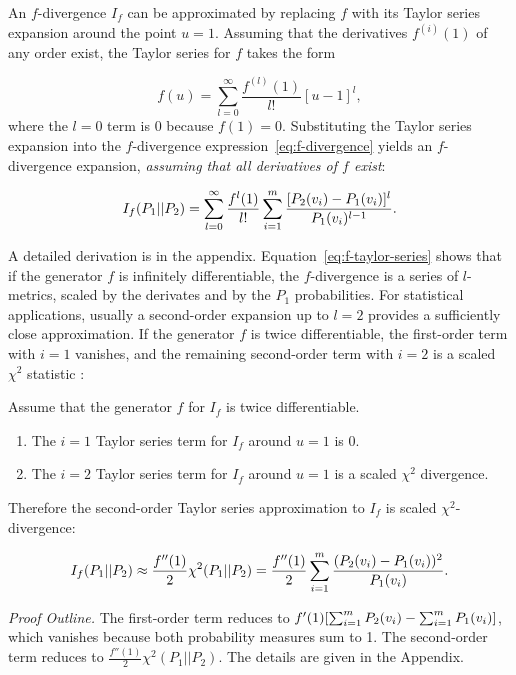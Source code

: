 {An $f$-divergence $I_{f}$ can be approximated by  replacing $f$ with its Taylor series expansion around the point $u=1$. Assuming that the derivatives $f^{(i)}(1)$ of any order exist, the Taylor series for $f$ takes the form 

 $$f(u) = \sum_{l=0}^{\infty} \frac{f^{(l)}(1)}{l!} [u-1]^{l},$$ where the $l=0$ term is 0 because $f(1) = 0$. Substituting the Taylor series expansion into the $f$-divergence expression~\eqref{eq:f-divergence}  yields an $f$-divergence expansion, {\em assuming that all derivatives of $f$ exist}:
 
\begin{equation*} \label{eq:f-taylor-series}
I_{f}(P_{1}||P_{2}) = \sum_{l=0}^{\infty} \frac{f^{l}(1)}{l!} \sum_{i=1}^{m} 
\frac{[P_{2}(v_{i}) - P_{1}(v_{i})]^{l}}
{P_{1}(v_{i})^{l-1}}.
\end{equation*}

A detailed derivation is in the appendix. Equation~\eqref{eq:f-taylor-series} shows that if the generator $f$ is infinitely differentiable, the $f$-divergence is a series of $l$-metrics, scaled by the derivates and by the $P_1$ probabilities. For statistical applications, usually a second-order expansion up to $l=2$ provides a sufficiently close approximation. If the generator $f$ is twice differentiable, the first-order term with $i=1$ vanishes, and the remaining second-order term with $i=2$ is a scaled $\chi^{2}$ statistic \citep{Nielsen2014}:

\begin{proposition} \label{prop:xi-square}
Assume that the generator $f$ for $I_{f}$ is twice differentiable.   

\begin{enumerate}
\item The $i=1$ Taylor series term for  $I_{f}$ around $u=1$ is 0.
\item The $i=2$ Taylor series term for  $I_{f}$ around $u=1$ is a scaled $\chi^{2}$ divergence.
\end{enumerate}

Therefore the second-order Taylor series approximation to $I_{f}$ is scaled $\chi^{2}$-divergence:

$$I_{f}(P_{1}||P_{2}) \approx \frac{f''(1)}{2} \chi^{2}(P_{1}||P_{2}) = \frac{f''(1)}{2} 
\sum_{i=1}^{m}  \frac{(P_{2}(v_{i})-P_{1}(v_{i}))^{2}}
 {P_{1}(v_{i})}.$$ 
\end{proposition} 

{\em Proof Outline.} 
The first-order term reduces to $f'(1) [\sum_{i=1}^{m} P_{2}(v_{i}) - \sum_{i=1}^{m} P_{1}(v_{i})]$, which vanishes because both probability measures sum to 1. The second-order term reduces to $ \frac{f''(1)}{2} \chi^{2}(P_{1}||P_{2})$. The details are given in the Appendix. 

}
